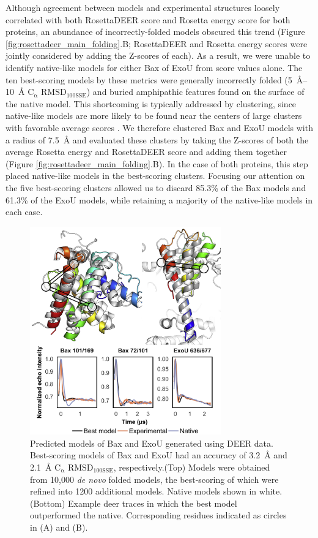 Although agreement between models and experimental structures loosely correlated with both RosettaDEER score and Rosetta energy score for both proteins, an abundance of incorrectly-folded models obscured this trend (Figure \ref{fig:rosettadeer_main_folding}.B; RosettaDEER and Rosetta energy scores were jointly considered by adding the Z-scores of each). As a result, we were unable to identify native-like models for either Bax of ExoU from score values alone. The ten best-scoring models by these metrics were generally incorrectly folded (\SIrange{5}{10}{\angstrom} $\mathrm{C_{\upalpha}}$ $\mathrm{RMSD_{100SSE}}$) and buried amphipathic features found on the surface of the native model. This shortcoming is typically addressed by clustering, since native-like models are more likely to be found near the centers of large clusters with favorable average scores \citep*{Shortle1998}. We therefore clustered Bax and ExoU models with a radius of \SI{7.5}{\angstrom} and evaluated these clusters by taking the Z-scores of both the average Rosetta energy and RosettaDEER score and adding them together (Figure \ref{fig:rosettadeer_main_folding}.B). In the case of both proteins, this step placed native-like models in the best-scoring clusters. Focusing our attention on the five best-scoring clusters allowed us to discard 85.3\% of the Bax models and 61.3\% of the ExoU models, while retaining a majority of the native-like models in each case.

\begin{figure}
    \centering
    \includegraphics[width=3.25in]{Figures/rosettadeer_main_bestmodels.jpg}
     \caption[Predicted models of Bax and ExoU generated using DEER data.]{Predicted models of Bax and ExoU generated using DEER data. Best-scoring models of Bax and ExoU had an accuracy of \SI{3.2}{\angstrom} and \SI{2.1}{\angstrom} $\mathrm{C_{\upalpha}}$ $\mathrm{RMSD_{100SSE}}$, respectively.(Top) Models were obtained from 10,000 \emph{de novo} folded models, the best-scoring of which were refined into 1200 additional models. Native models shown in white. (Bottom) Example \gls{deer} traces in which the best model outperformed the native. Corresponding residues indicated as circles in (A) and (B).}
    \label{fig:rosettadeer_main_bestmodels}
\end{figure}

